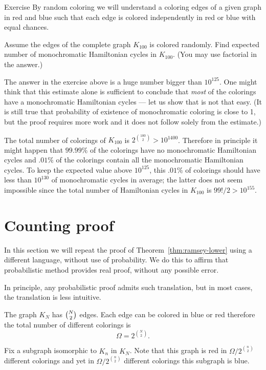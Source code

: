 \begin{thm}{Exercise}
By random coloring we will understand a coloring edges of a given graph in red and blue such that each edge is colored independently in red or blue with equal chances. 

Assume the edges of the complete graph $K_{100}$ is colored randomly. 
Find expected number of monochromatic Hamiltonian cycles in $K_{100}$.
(You may use factorial in the answer.)
\end{thm} 

The answer in the exercise above is a huge number bigger than $10^{125}$.
One might think that this estimate alone is sufficient to conclude that {}\emph{most} of the colorings have a monochromatic Hamiltonian cycles --- let us show that is not that easy.
(It is still true that probability of existence of monochromatic coloring is close to 1, but the proof requires more work and it does not follow solely from the estimate.)

The total number of colorings of $K_{100}$ is $2^{\binom{100}2}>10^{1400}$.
Therefore in principle it might happen that $99.99\%$ of the colorings have no monochromatic Hamiltonian cycles and $.01\%$ of the colorings contain all the monochromatic Hamiltonian cycles.
To keep the expected value above $10^{125}$,
this $.01\%$ of colorings should have less than $10^{130}$ of monochromatic cycles in average;
the latter does not seem impossible since the total number of Hamiltonian cycles in $K_{100}$ is $99!/2>10^{155}$.

\section*{Counting proof}

In this section we will repeat the proof of Theorem~\ref{thm:ramsey-lower} using a different language, without use of probability.
We do this to affirm that probabilistic method provides real proof, without any possible error.

In principle,  any probabilistic proof admits such translation,
but in most cases, the translation is less intuitive. 

The graph $K_N$ has $\tbinom{N}{2}$ edges.
Each edge can be colored in blue or red therefore the total number of different colorings is \[\Omega=2^{\binom{N}{2}}.\]

Fix a subgraph isomorphic to $K_n$ in $K_N$.
Note that this graph is red in $\Omega/2^{\binom n2}$ different colorings
and yet in $\Omega/2^{\binom n2}$ different colorings this subgraph is blue.


